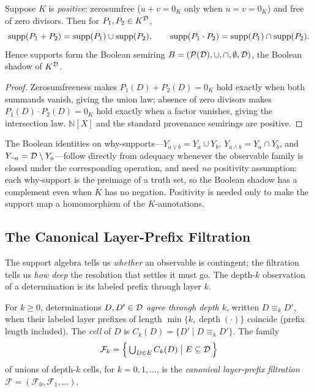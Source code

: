 \begin{proposition}
  \label{prop:support-hom}
  Suppose $K$ is \emph{positive}: zerosumfree ($u + v = 0_K$ only when
  $u = v = 0_K$) and free of zero divisors. Then for
  $P_1, P_2 \in K^{\mathcal{D}}$,
  \[
    \operatorname{supp}(P_1 + P_2) = \operatorname{supp}(P_1) \cup \operatorname{supp}(P_2),
    \qquad
    \operatorname{supp}(P_1 \cdot P_2) = \operatorname{supp}(P_1) \cap \operatorname{supp}(P_2).
  \]
  Hence supports form the Boolean semiring
  $B = (\mathcal{P}(\mathcal{D}), \cup, \cap, \emptyset, \mathcal{D})$, the Boolean shadow
  of $K^{\mathcal{D}}$.
\end{proposition}
\begin{proof}
  Zerosumfreeness makes $P_1(D)+P_2(D) = 0_K$ hold exactly when both summands
  vanish, giving the union law; absence of zero divisors makes
  $P_1(D)\cdot P_2(D) = 0_K$ hold exactly when a factor vanishes, giving the
  intersection law. $\mathbb{N}[X]$ and the standard provenance semirings are
  positive.
\end{proof}

\noindent
The Boolean identities on why-supports---$Y_{a \lor b} = Y_a \cup Y_b$,
$Y_{a \land b} = Y_a \cap Y_b$, and $Y_{\neg a} = \mathcal{D} \setminus Y_a$---follow
directly from adequacy whenever the observable family is closed under the
corresponding operation, and need \emph{no} positivity assumption: each
why-support is the preimage of a truth set, so the Boolean shadow has a
complement even when $K$ has no negation. Positivity is needed only to make the
support map a homomorphism of the $K$-annotations.

\subsection{The Canonical Layer-Prefix Filtration}
\label{sec:filtration}

The support algebra tells us \emph{whether} an observable is contingent; the
filtration tells us \emph{how deep} the resolution that settles it must go.
The depth-$k$ observation of a determination is its labeled prefix through
layer $k$.

\begin{definition}
  \label{def:filtration}
  For $k \ge 0$, determinations $D, D' \in \mathcal{D}$ \emph{agree through depth
  $k$}, written $D \equiv_k D'$, when their labeled layer prefixes of length
  $\min\{k,\operatorname{depth}(\cdot)\}$ coincide (prefix length included).
  The \emph{cell} of $D$ is $C_k(D) = \{D' \mid D \equiv_k D'\}$. The family
  \[
    \mathcal{F}_k
    = \Bigl\{\, \textstyle\bigcup_{D \in E} C_k(D) \;\big|\; E \subseteq \mathcal{D} \,\Bigr\}
  \]
  of unions of depth-$k$ cells, for $k = 0,1,\dots$, is the \emph{canonical
  layer-prefix filtration} $\mathcal{F} = (\mathcal{F}_0, \mathcal{F}_1, \dots)$.
\end{definition}

